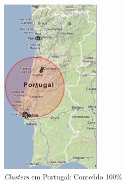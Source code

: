 \begin{figure}[h]
\centering
\begin{subfigure}[b]{.2\textwidth}
  \centering
  \includegraphics[width=0.98\linewidth]{./figures/tweeprofiles/extp1}
  \caption{\textit{Clusters} em Portugal: Conteúdo 100\%}
  \label{fig:sfig1}
\end{subfigure}
\quad
\begin{subfigure}[b]{.2\textwidth}
  \centering

\end{subfigure}
\end{figure}
